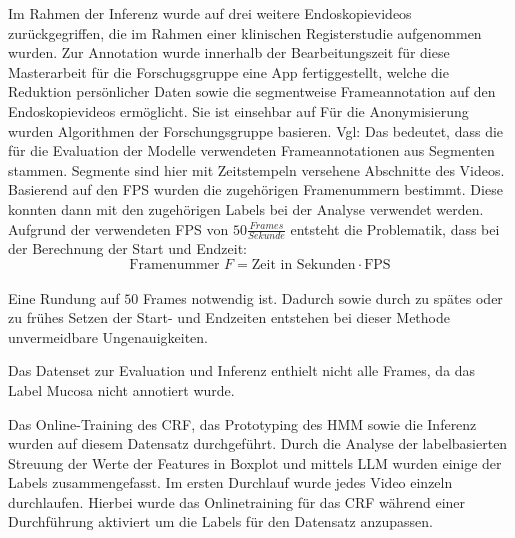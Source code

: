 Im Rahmen der Inferenz wurde auf drei weitere Endoskopievideos zurückgegriffen, die im Rahmen einer klinischen Registerstudie aufgenommen wurden. Zur Annotation wurde innerhalb der Bearbeitungszeit für diese Masterarbeit für die Forschugsgruppe eine App fertiggestellt, welche die Reduktion persönlicher Daten sowie die segmentweise Frameannotation auf den Endoskopievideos ermöglicht. Sie ist einsehbar auf \href{https://github.com/wg-lux/lx-annotate}\cite{lxAnnotate} Für die Anonymisierung wurden Algorithmen der Forschungsgruppe basieren. Vgl: \cite{Lux2025EndoRegDB}\cite{Lux2025LocalLLMAnonymization}
Das bedeutet, dass die für die Evaluation der Modelle verwendeten Frameannotationen aus Segmenten stammen. Segmente sind hier mit Zeitstempeln versehene Abschnitte des Videos. Basierend auf den FPS wurden die zugehörigen Framenummern bestimmt. Diese konnten dann mit den zugehörigen Labels bei der Analyse verwendet werden. Aufgrund der verwendeten FPS von $50\frac{Frames}{Sekunde}$ entsteht die Problematik, dass bei der Berechnung der Start und Endzeit:
\\
\begin{equation}
    \text{Framenummer } F = \text{Zeit in Sekunden} \cdot \text{FPS}
\end{equation}
\\
Eine Rundung auf $50$ Frames notwendig ist.
Dadurch sowie durch zu spätes oder zu frühes Setzen der Start- und Endzeiten entstehen bei dieser Methode unvermeidbare Ungenauigkeiten.

Das Datenset zur Evaluation und Inferenz enthielt nicht alle Frames, da das Label Mucosa nicht annotiert wurde.

Das Online-Training des CRF, das Prototyping des HMM sowie die Inferenz wurden auf diesem Datensatz durchgeführt. Durch die Analyse der labelbasierten Streuung der Werte der Features in Boxplot und mittels LLM wurden einige der Labels zusammengefasst. Im ersten Durchlauf wurde jedes Video einzeln durchlaufen. Hierbei wurde das Onlinetraining für das CRF während einer Durchführung aktiviert um die Labels für den Datensatz anzupassen.
